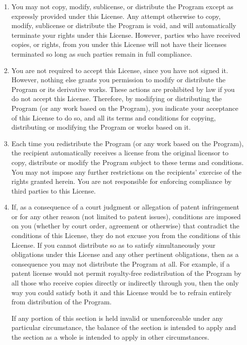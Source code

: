 {\begin{multicols}{2}
\begin{enumerate}
\item
You may not copy, modify, sublicense, or distribute the Program
except as expressly provided under this License.  Any attempt
otherwise to copy, modify, sublicense or distribute the Program is
void, and will automatically terminate your rights under this License.
However, parties who have received copies, or rights, from you under
this License will not have their licenses terminated so long as such
parties remain in full compliance.

\item
You are not required to accept this License, since you have not
signed it.  However, nothing else grants you permission to modify or
distribute the Program or its derivative works.  These actions are
prohibited by law if you do not accept this License.  Therefore, by
modifying or distributing the Program (or any work based on the
Program), you indicate your acceptance of this License to do so, and
all its terms and conditions for copying, distributing or modifying
the Program or works based on it.

\item
Each time you redistribute the Program (or any work based on the
Program), the recipient automatically receives a license from the
original licensor to copy, distribute or modify the Program subject to
these terms and conditions.  You may not impose any further
restrictions on the recipients' exercise of the rights granted herein.
You are not responsible for enforcing compliance by third parties to
this License.

\item
If, as a consequence of a court judgment or allegation of patent
infringement or for any other reason (not limited to patent issues),
conditions are imposed on you (whether by court order, agreement or
otherwise) that contradict the conditions of this License, they do not
excuse you from the conditions of this License.  If you cannot
distribute so as to satisfy simultaneously your obligations under this
License and any other pertinent obligations, then as a consequence you
may not distribute the Program at all.  For example, if a patent
license would not permit royalty-free redistribution of the Program by
all those who receive copies directly or indirectly through you, then
the only way you could satisfy both it and this License would be to
refrain entirely from distribution of the Program.

If any portion of this section is held invalid or unenforceable under
any particular circumstance, the balance of the section is intended to
apply and the section as a whole is intended to apply in other
circumstances.


\end{enumerate}
\end{multicols}}
